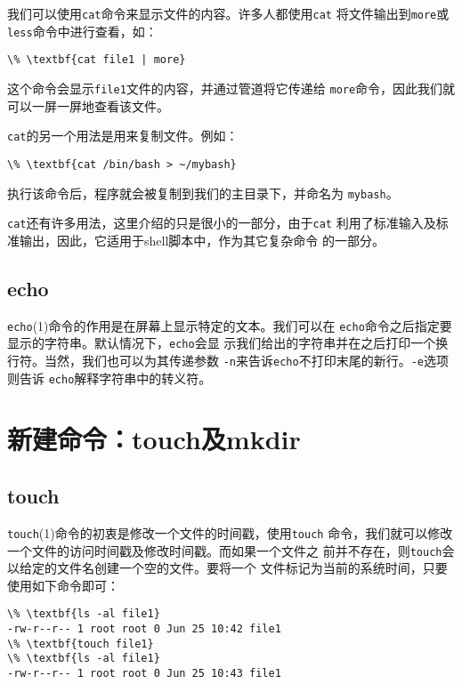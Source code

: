 我们可以使用\texttt{cat}命令来显示文件的内容。许多人都使用\texttt{cat}
将文件输出到\texttt{more}或\texttt{less}命令中进行查看，如：
\begin{Verbatim}[frame=single, commandchars=\\\{\}]
\% \textbf{cat file1 | more}
\end{Verbatim}
这个命令会显示\texttt{file1}文件的内容，并通过管道将它传递给
\texttt{more}命令，因此我们就可以一屏一屏地查看该文件。

\texttt{cat}的另一个用法是用来复制文件。例如：
\begin{Verbatim}[frame=single, commandchars=\\\{\}]
\% \textbf{cat /bin/bash > ~/mybash}
\end{Verbatim}
执行该命令后，程序就会被复制到我们的主目录下，并命名为
\texttt{mybash}。

\texttt{cat}还有许多用法，这里介绍的只是很小的一部分，由于\texttt{cat}
利用了标准输入及标准输出，因此，它适用于shell脚本中，作为其它复杂命令
的一部分。


\subsection{echo}
\label{sec:handlingFilesAndDirectories:simpleOutput:echo}
\texttt{echo}(1)命令的作用是在屏幕上显示特定的文本。我们可以在
\texttt{echo}命令之后指定要显示的字符串。默认情况下，\texttt{echo}会显
示我们给出的字符串并在之后打印一个换行符。当然，我们也可以为其传递参数
\texttt{-n}来告诉\texttt{echo}不打印末尾的新行。\texttt{-e}选项则告诉
\texttt{echo}解释字符串中的转义符。

\section{新建命令：touch及mkdir}
\label{sec:handlingFilesAndDirectories:creation}

\subsection{touch}
\label{sec:handlingFilesAndDirectories:creation:touch}
\texttt{touch}(1)命令的初衷是修改一个文件的时间戳，使用\texttt{touch}
命令，我们就可以修改一个文件的访问时间戳及修改时间戳。而如果一个文件之
前并不存在，则\texttt{touch}会以给定的文件名创建一个空的文件。要将一个
文件标记为当前的系统时间，只要使用如下命令即可：
\begin{Verbatim}[frame=single, commandchars=\\\{\}]
\% \textbf{ls -al file1}
-rw-r--r-- 1 root root 0 Jun 25 10:42 file1
\% \textbf{touch file1}
\% \textbf{ls -al file1}
-rw-r--r-- 1 root root 0 Jun 25 10:43 file1
\end{Verbatim}


